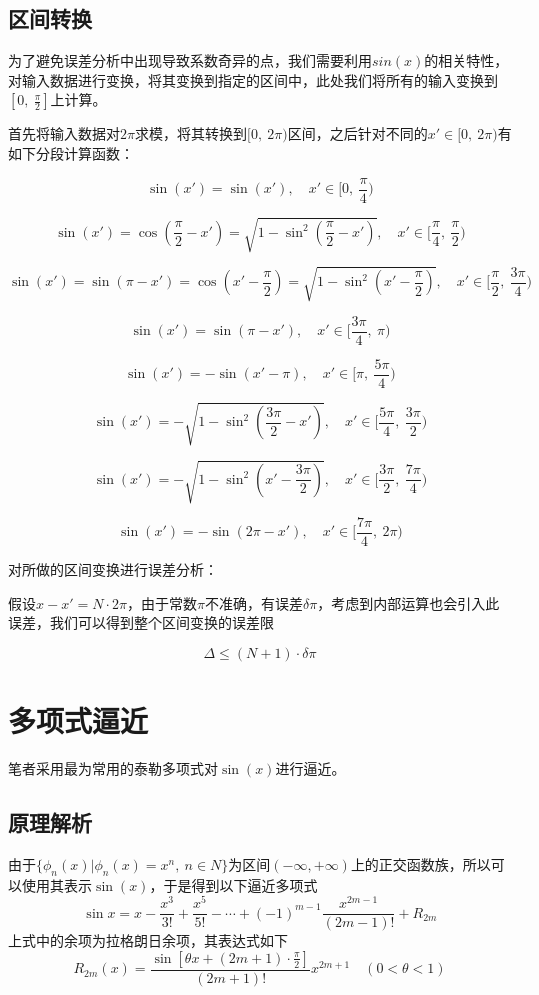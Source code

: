 \documentclass[lang=cn,11pt,a4paper]{elegantpaper}
\begin{document}
\subsection{区间转换}
为了避免误差分析中出现导致系数奇异的点，我们需要利用$sin(x)$的相关特性，对输入数据进行变换，将其变换到指定的区间中，此处我们将所有的输入变换到$[0,\ \frac{\pi}{2}]$上计算。

首先将输入数据对$2\pi$求模，将其转换到$[0,\ 2\pi)$区间，之后针对不同的$x'\in [0,\ 2\pi)$有如下分段计算函数：

$$\sin(x')=\sin(x'),\quad x'\in [0,\ \frac{\pi}{4})$$

$$\sin(x')=\cos(\frac{\pi}{2}-x')=\sqrt{1-\sin^2(\frac{\pi}{2}-x')},\quad x'\in [\frac{\pi}{4},\ \frac{\pi}{2})$$

$$\sin(x')=\sin(\pi -x')=\cos(x'-\frac{\pi}{2})=\sqrt{1-\sin^2(x'-\frac{\pi}{2})},\quad x'\in [\frac{\pi}{2},\ \frac{3\pi}{4})$$

$$\sin(x')=\sin(\pi -x'),\quad x'\in [\frac{3\pi}{4},\ \pi)$$

$$\sin(x')=-\sin(x'-\pi),\quad x'\in [\pi,\ \frac{5\pi}{4})$$

$$\sin(x')=-\sqrt{1-\sin^2(\frac{3\pi}{2}-x')},\quad x'\in [\frac{5\pi}{4},\ \frac{3\pi}{2})$$

$$\sin(x')=-\sqrt{1-\sin^2(x'-\frac{3\pi}{2})},\quad x'\in [\frac{3\pi}{2},\ \frac{7\pi}{4})$$

$$\sin(x')=-\sin(2\pi -x'),\quad x'\in [\frac{7\pi}{4},\ 2\pi)$$

对所做的区间变换进行误差分析：

假设$x-x'=N\cdot 2\pi$，由于常数$\pi$不准确，有误差$\delta \pi$，考虑到内部运算也会引入此误差，我们可以得到整个区间变换的误差限

$$\Delta \leq (N+1)\cdot \delta \pi$$
\section{多项式逼近}
笔者采用最为常用的泰勒多项式对$\sin(x)$进行逼近。
\subsection{原理解析}
由于$\{\phi_n(x)|\phi_n(x)=x^n,\ n\in N\}$为区间$(-\infty,+\infty)$上的正交函数族，所以可以使用其表示$\sin(x)$，于是得到以下逼近多项式
\begin{equation}
  \sin x=x-\frac{x^{3}}{3 !}+\frac{x^{5}}{5 !}-\cdots+(-1)^{m-1} \frac{x^{2 m-1}}{(2 m-1) !}+R_{2 m}
\end{equation}
上式中的余项为拉格朗日余项，其表达式如下
\begin{equation}
  R_{2 m}(x)=\frac{\sin \left[\theta x+(2 m+1)\cdot \frac{\pi}{2}\right]}{(2 m+1) !} x^{2 m+1} \quad(0<\theta<1)
\end{equation}
\end{document}
